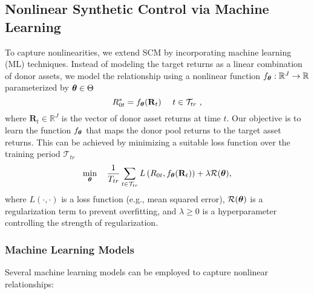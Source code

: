 \subsection{Nonlinear Synthetic Control via Machine Learning}
To capture nonlinearities, we extend SCM by incorporating machine learning (ML) techniques. 
Instead of modeling the target returns as a linear combination of donor assets, we model the relationship using a nonlinear function $f_{\boldsymbol \theta} : \mathbb{R}^{J} \rightarrow \mathbb{R}$ parameterized by $\boldsymbol \theta\in\Theta$
$$
R_{0t}^* = f_{\boldsymbol \theta}(\mathbf{R}_{t}) 
~~~~ 
t \in \mathcal{T}_{tr} 
~,
$$
where $\mathbf{R}_{t} \in \mathbb{R}^{J}$ is the vector of donor asset returns at time $t$.
%
Our objective is to learn the function $f_{\boldsymbol \theta}$ that maps the donor pool returns to the target asset returns. This can be achieved by minimizing a suitable loss function over the training period $\mathcal{T}_{tr}$
$$
\min_{\boldsymbol \theta} \quad \frac{1}{T_{tr}} \sum_{t \in \mathcal{T}_{tr}} L\left( R_{0t}, f_{\boldsymbol \theta}(\mathbf{R}_{t}) \right) 
+ \lambda \mathcal{R}(\boldsymbol \theta)
,
$$
where $L(\cdot, \cdot)$ is a loss function (e.g., mean squared error), $\mathcal{R}(\boldsymbol \theta)$ is a regularization term to prevent overfitting, and $\lambda \geq 0$ is a hyperparameter controlling the strength of regularization.

\subsubsection{Machine Learning Models}

Several machine learning models can be employed to capture nonlinear relationships:

